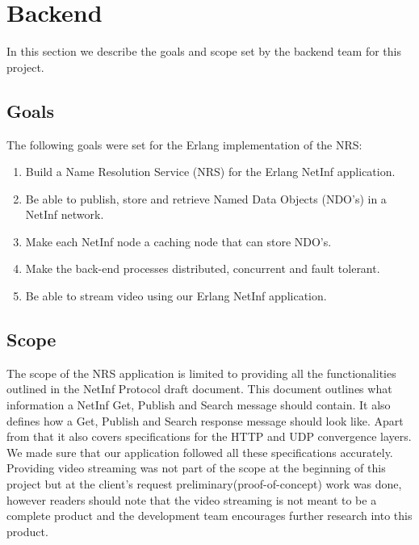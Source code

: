 \section{Backend}
In this section we describe the goals and scope set by the backend team for this project.

\subsection{Goals}
The following goals were set for the Erlang implementation of the NRS:
\begin{enumerate}
 \item {Build a Name Resolution Service (NRS) for the Erlang NetInf application.}\\
 \item {Be able to publish, store and retrieve Named Data Objects (NDO's) in a NetInf network.}\\
 \item {Make each NetInf node a caching node that can store NDO's.}\\
 \item {Make the back-end processes distributed, concurrent and fault tolerant.}\\ 
 \item {Be able to stream video using our Erlang NetInf application.}\\
  \end{enumerate}

\subsection{Scope}
The scope of the NRS application is limited to providing all the functionalities outlined in the NetInf Protocol draft document. \cite{netinfproto} This document outlines what information a NetInf Get, Publish and Search message should contain. It also defines how a Get, Publish and Search response message should look like. Apart from that it also covers specifications for the HTTP and UDP convergence layers. We made sure that our application followed all these specifications accurately. Providing video streaming was not part of the scope at the beginning of this project but at the client's request preliminary(proof-of-concept) work was done, however readers should note that the video streaming is not meant to be a complete product and the development team encourages further research into this product.
